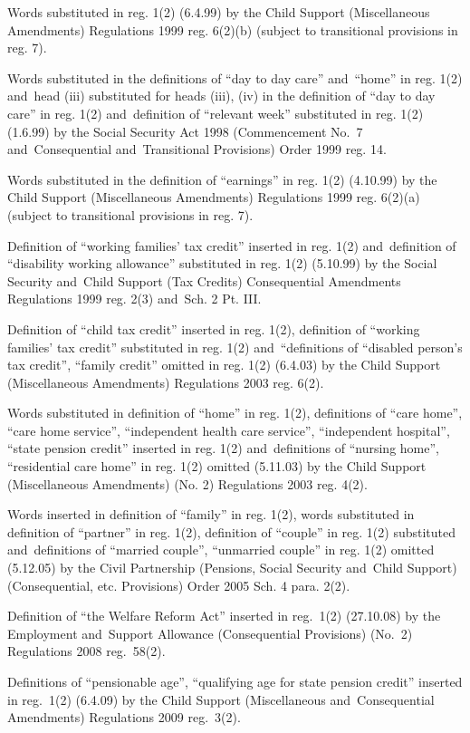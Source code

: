 \documentclass[12pt,a4paper]{article}
\begin{document}
{Words substituted in reg. 1(2) (6.4.99) by the Child Support (Miscellaneous Amendments) Regulations 1999 reg. 6(2)(b) (subject to transitional provisions in reg. 7).

Words substituted in the definitions of ``day to day care'' and~``home'' in reg. 1(2) and~head (iii) substituted for heads (iii), (iv) in the definition of ``day to day care'' in reg. 1(2) and~definition of ``relevant week'' substituted in reg. 1(2) (1.6.99) by the Social Security Act 1998 (Commencement No.\ 7 and~Consequential and~Transitional Provisions) Order 1999 reg. 14.

Words substituted in the definition of ``earnings'' in reg. 1(2) (4.10.99) by the Child Support (Miscellaneous Amendments) Regulations 1999 reg. 6(2)(a) (subject to transitional provisions in reg. 7).

Definition of ``working families' tax credit'' inserted in reg. 1(2) and~definition of ``disability working allowance'' substituted in reg. 1(2) (5.10.99) by the Social Security and~Child Support (Tax Credits) Consequential Amendments Regulations 1999 reg. 2(3) and~Sch. 2 Pt. III.

Definition of ``child tax credit'' inserted in reg. 1(2), definition of ``working families' tax credit'' substituted in reg. 1(2) and~``definitions of ``disabled person's tax credit'', ``family credit'' omitted in reg. 1(2) (6.4.03) by the Child Support (Miscellaneous Amendments) Regulations 2003 reg. 6(2).

Words substituted in definition of ``home'' in reg. 1(2), definitions of ``care home'', ``care home service'', ``independent health care service'', ``independent hospital'', ``state pension credit'' inserted in reg. 1(2) and~definitions of ``nursing home'', ``residential care home'' in reg. 1(2) omitted (5.11.03) by the Child Support (Miscellaneous Amendments) (No. 2) Regulations 2003 reg. 4(2).

Words inserted in definition of ``family'' in reg. 1(2), words substituted in definition of ``partner'' in reg. 1(2), definition of ``couple'' in reg. 1(2) substituted and~definitions of ``married couple'', ``unmarried couple'' in reg. 1(2) omitted (5.12.05) by the Civil Partnership (Pensions, Social Security and~Child Support) (Consequential, etc. Provisions) Order 2005 Sch. 4 para. 2(2).

Definition of ``the Welfare Reform Act'' inserted in reg.~1(2) (27.10.08) by the Employment and~Support Allowance (Consequential Provisions) (No.~2) Regulations 2008 reg.~58(2).

Definitions of ``pensionable age'', ``qualifying age for state pension credit'' inserted in reg.~1(2)
(6.4.09) by the Child Support (Miscellaneous and~Consequential Amendments) Regulations 2009 reg.~3(2).
}
\end{document}

